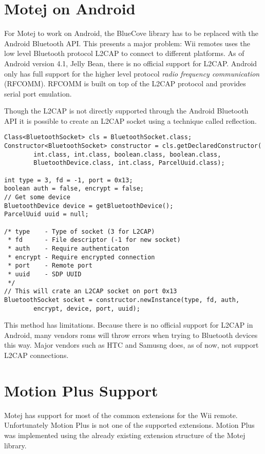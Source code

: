 \section{Motej on Android}
For Motej to work on Android, the BlueCove library has to be replaced with the Android Bluetooth API. This presents a major problem: Wii remotes uses the low level Bluetooth protocol L2CAP to connect to different platforms. As of Android version 4.1, Jelly Bean, \cite{jellyBean} there is no official support for L2CAP. Android only has full support for the higher level protocol \emph{radio frequency communication} (RFCOMM). RFCOMM is built on top of the L2CAP protocol and provides serial port emulation. 

Though the L2CAP is not directly supported through the Android Bluetooth API it is possible to create an L2CAP socket using a technique called reflection.

\begin{lstlisting}
Class<BluetoothSocket> cls = BluetoothSocket.class;
Constructor<BluetoothSocket> constructor = cls.getDeclaredConstructor(
		int.class, int.class, boolean.class, boolean.class,
		BluetoothDevice.class, int.class, ParcelUuid.class);

int type = 3, fd = -1, port = 0x13;
boolean auth = false, encrypt = false;
// Get some device
BluetoothDevice device = getBluetoothDevice();
ParcelUuid uuid = null;

/* type    - Type of socket (3 for L2CAP)
 * fd      - File descriptor (-1 for new socket)
 * auth    - Require authenticaton
 * encrypt - Require encrypted connection
 * port    - Remote port
 * uuid	   - SDP UUID
 */
// This will crate an L2CAP socket on port 0x13
BluetoothSocket socket = constructor.newInstance(type, fd, auth,
		encrypt, device, port, uuid);
\end{lstlisting}

This method has limitations. Because there is no official support for L2CAP in Android, many vendors roms will throw errors when trying to Bluetooth devices this way. Major vendors such as HTC and Samusng does, as of now, not support L2CAP connections.

\section{Motion Plus Support}
Motej has support for most of the common extensions for the Wii remote. Unfortunately Motion Plus is not one of the supported extensions. Motion Plus was implemented using the already existing extension structure of the Motej library.

